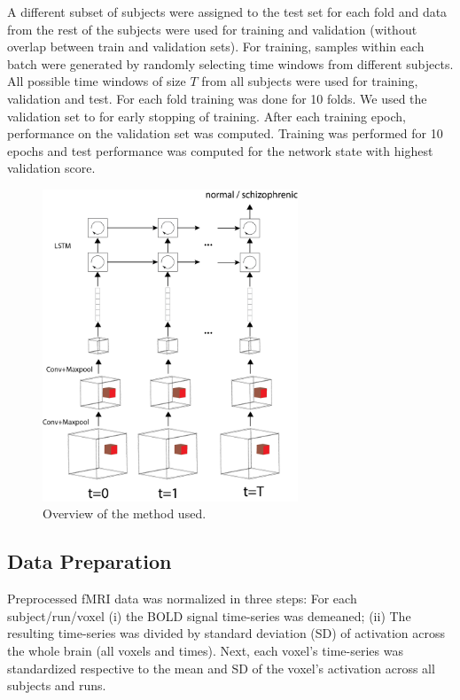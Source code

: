 \documentclass{article} %
\begin{document}
A different subset of subjects were assigned to the test set for each fold and data from the rest of the subjects were used for training and validation (without overlap between train and validation sets). For training, samples within each batch were generated by randomly selecting time windows from different subjects. All possible time windows of size $T$ from all subjects were used for training, validation and test. For each fold training was done for 10 folds. We used the validation set to for early stopping of training. After each training epoch, performance on the validation set was computed. Training was performed for 10 epochs and test performance was computed for the network state with highest validation score. 



\begin{figure}[t]
\begin{center}
\includegraphics[width=3in]{figures/overview.png}
\end{center}
\caption{Overview of the method used.}
\label{fig1}
\end{figure}

\subsection{Data Preparation}
Preprocessed fMRI data was normalized in three steps: For each subject/run/voxel (i) the BOLD signal time-series was demeaned; (ii) The resulting time-series was divided by standard deviation (SD) of activation across the whole brain (all voxels and times). Next, each voxel’s time-series was standardized respective to the mean and SD of the voxel’s activation across all subjects and runs.  
\end{document}
